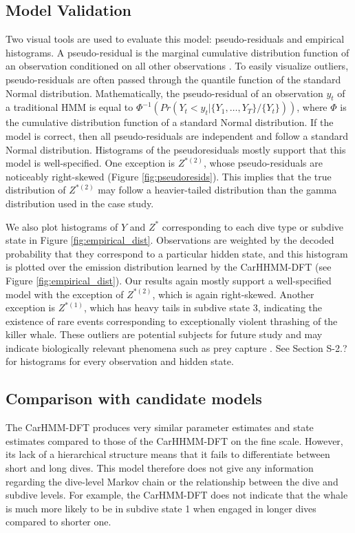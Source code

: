 \subsection{Model Validation}
\label{subsec:model_validation}

Two visual tools are used to evaluate this model: pseudo-residuals and empirical histograms. A pseudo-residual is the marginal cumulative distribution function of an observation conditioned on all other observations \citep{Zucchini:2016}. To easily visualize outliers, pseudo-residuals are often passed through the quantile function of the standard Normal distribution. Mathematically, the pseudo-residual of an observation $y_t$ of a traditional HMM is equal to $\Phi^{-1} \left(Pr(Y_t < y_t|\{Y_1,\ldots,Y_T\}/\{Y_t\}) \right)$, where $\Phi$ is the cumulative distribution function of a standard Normal distribution. If the model is correct, then all pseudo-residuals are independent and follow a standard Normal distribution. Histograms of the pseudoresiduals mostly support that this model is well-specified. One exception is $Z^{*(2)}$, whose pseudo-residuals are noticeably right-skewed (Figure \ref{fig:pseudoresids}). This implies that the true distribution of $Z^{*(2)}$ may follow a heavier-tailed distribution than the gamma distribution used in the case study. 

We also plot histograms of $Y$ and $Z^*$ corresponding to each dive type or subdive state in Figure \ref{fig:empirical_dist}. Observations are weighted by the decoded probability that they correspond to a particular hidden state, and this histogram is plotted over the emission distribution learned by the CarHHMM-DFT (see Figure \ref{fig:empirical_dist}). Our results again mostly support a well-specified model with the exception of $Z^{*(2)}$, which is again right-skewed. Another exception is $Z^{*(1)}$, which has heavy tails in subdive state 3, indicating the existence of rare events corresponding to exceptionally violent thrashing of the killer whale. These outliers are potential subjects for future study and may indicate biologically relevant phenomena such as prey capture \citep{Tennessen:2019a}. See Section S-2.? for histograms for every observation and hidden state. 

\subsection{Comparison with candidate models}

The CarHMM-DFT produces very similar parameter estimates and state estimates compared to those of the CarHHMM-DFT on the fine scale. However, its lack of a hierarchical structure means that it fails to differentiate between short and long dives. This model therefore does not give any information regarding the dive-level Markov chain or the relationship between the dive and subdive levels. For example, the CarHMM-DFT does not indicate that the whale is much more likely to be in subdive state 1 when engaged in longer dives compared to shorter one.

